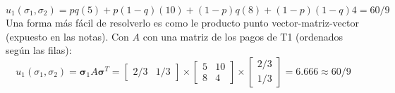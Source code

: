 \documentclass[12pt]{article} %
\newcommand{\vect}[1]{\boldsymbol{#1}}
\begin{document}
\begin{Exercise}[name={Respuesta}]
\begin{enumerate}
  \[
    u_1(\sigma_1, \sigma_2) = pq(5) + p(1-q)(10) + (1-p)q(8) + (1-p)(1-q)4 = 60/9
  \]
  Una forma más fácil de resolverlo es como le producto punto vector-matriz-vector (expuesto en las notas). Con $ A $ con una matriz de los pagos de T1 (ordenados según las filas):
  \[
    u_1(\sigma_1, \sigma_2)= \vect{\sigma}_1 A\vect{\sigma}^T = %
    \begin{bmatrix} 
      2/3 & 1/3
    \end{bmatrix}\times
    \begin{bmatrix} 
      5 & 10 \\
      8 & 4
    \end{bmatrix}\times 
    \begin{bmatrix} 
      2/3 \\ 1/3
    \end{bmatrix} = 6.666 \approx 60/9
  \]
  
\end{enumerate}
  
\end{Exercise}
\end{document}

